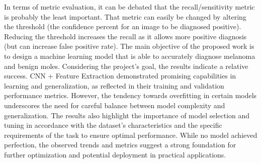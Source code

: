 \documentclass[10pt,twocolumn]{article}
\begin{document}
In terms of metric evaluation, it can be debated that the recall/sensitivity metric is probably the least important. That metric can easily be changed by altering the threshold (the confidence percent for an image to be diagnosed positive). Reducing the threshold increases the recall as it allows more positive diagnosis (but can increase false positive rate). 
The main objective of the proposed work is to design a machine learning model that is able to accurately diagnose melanoma and benign moles. Considering the project's goal, the results indicate a relative success. CNN + Feature Extraction demonstrated promising capabilities in learning and generalization, as reflected in their training and validation performance metrics. However, the tendency towards overfitting in certain models underscores the need for careful balance between model complexity and generalization. The results also highlight the importance of model selection and tuning in accordance with the dataset's characteristics and the specific requirements of the task to ensure optimal performance. While no model achieved perfection, the observed trends and metrics suggest a strong foundation for further optimization and potential deployment in practical applications.
\end{document}

